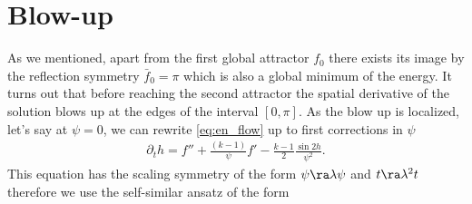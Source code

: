 \section*{Blow-up}

As we mentioned, apart from the first global attractor $f_0$ there
exists its image by the reflection symmetry $\bar{f}_0=\pi$ which is
also a global minimum of the energy. It turns out that before reaching
the second attractor the spatial derivative of the solution blows up
at the edges of the interval $[0,\pi]$. As the blow up is localized,
let's say at $\psi=0$, we can rewrite \eqref{eq:en_flow} up to first
corrections in $\psi$
\begin{align}
  \label{eq:2}
  \partial_t h=f''+\frac{(k-1)}{\psi}f'-\frac{k-1}{2}\frac{\sin2h}{\psi^2}.
\end{align}
This equation has the scaling symmetry of the form
$\psi\ra\lambda\psi$ and $t\ra\lambda^2t$ therefore we use the
self-similar ansatz of the form







